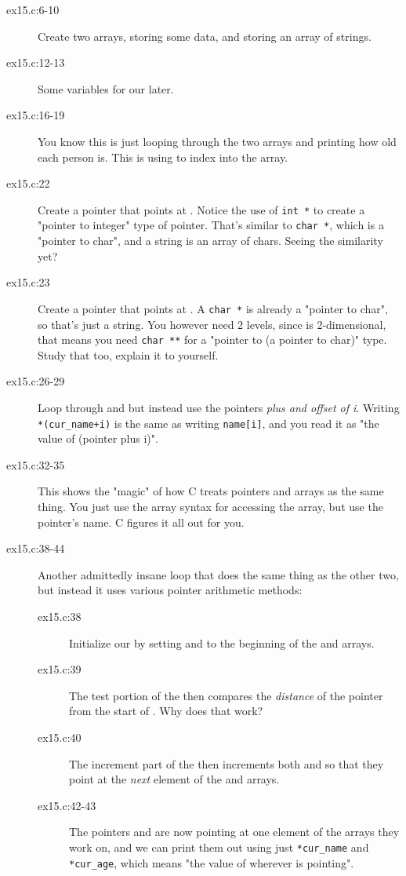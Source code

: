 \begin{description}
\item[ex15.c:6-10] Create two arrays,  storing some 
    data, and  storing an array of strings.
\item[ex15.c:12-13] Some variables for our  later.
\item[ex15.c:16-19] You know this is just looping through the two arrays and
    printing how old each person is.  This is using  to 
    index into the array.
\item[ex15.c:22] Create a pointer that points at .
    Notice the use of \verb|int *| to create a
    "pointer to integer" type of pointer.  That's similar to 
    \verb|char *|, which is a "pointer to char", and a string
    is an array of chars.  Seeing the similarity yet?
\item[ex15.c:23] Create a pointer that points at .
    A \verb|char *| is already a "pointer to char", so that's 
    just a string.  You however need 2 levels, since 
    is 2-dimensional, that means you need \verb|char **| for
    a "pointer to (a pointer to char)" type. Study that too, explain
    it to yourself.
\item[ex15.c:26-29] Loop through  and  but instead
    use the pointers \emph{plus and offset of i}.  Writing
    \verb|*(cur_name+i)| is the same as writing \verb|name[i]|, and
    you read it as "the value of (pointer  plus i)".
\item[ex15.c:32-35] This shows the "magic" of how C treats pointers and
    arrays as the same thing.  You just use the array syntax for
    accessing the array, but use the pointer's name.  C figures it
    all out for you.
\item[ex15.c:38-44] Another admittedly insane loop that does the same thing
    as the other two, but instead it uses various pointer arithmetic
    methods:
    \begin{description}
    \item[ex15.c:38] Initialize our  by setting 
        and  to the beginning of the  and
         arrays.
    \item[ex15.c:39] The test portion of the  then compares
        the \emph{distance} of the pointer  from the
        start of .  Why does that work?
    \item[ex15.c:40] The increment part of the  then increments
        both  and  so that they point
        at the \emph{next} element of the  and 
        arrays.
    \item[ex15.c:42-43] The pointers  and  
        are now pointing at one element of the arrays they work on,
        and we can print them out using just \verb|*cur_name| and
        \verb|*cur_age|, which means "the value of wherever 
            is pointing".
    \end{description}
\end{description}

